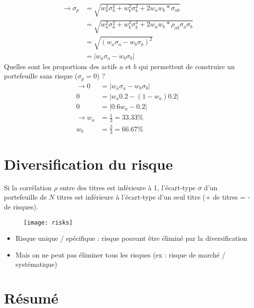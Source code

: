 \begin{enumerate}
\begin{align*}
        \longrightarrow \sigma_p &= \sqrt{w_a^2 \sigma_a^2 + w_b^2 \sigma_b^2 + 2 w_a w_b * \sigma_{ab}} \\
                                 &= \sqrt{w_a^2 \sigma_a^2 + w_b^2 \sigma_b^2 + 2 w_a w_b * \rho_{ab} \sigma_a \sigma_b} \\
                                 &= \sqrt{(w_a \sigma_a - w_b \sigma_b)^2} \\
                                 &= | w_a \sigma_a - w_b \sigma_b |
    \end{align*}
    Quelles sont les proportions des actifs $a$ et $b$ qui permettent de construire un portefeuille sans risque ($\sigma_p = 0$) ?
    \begin{align*}
        \longrightarrow   0 &= | w_a \sigma_a - w_b \sigma_b | \\
                          0 &= | w_a 0.2 - (1-w_a) 0.2 | \\
                          0 &= | 0.6 w_a - 0.2 | \\
        \longrightarrow w_a &= \frac{1}{3} = 33.33\% \\
                        w_b &= \frac{2}{3} = 66.67\%
    \end{align*}
\end{enumerate}

\newpage
\section{Diversification du risque}

Si la corrélation $\rho$ entre des titres est inférieure à 1, l'écart-type $\sigma$ d'un portefeuille de $N$ titres est inférieure à l'écart-type d'un seul titre (+ de titres = - de risques).
\begin{figure}[H]
    \centering
    \texttt{[image: risks]}
\end{figure}
\begin{itemize}
    \item Risque unique / spécifique : risque pouvant être éliminé par la diversification
    \item Mais on ne peut pas éliminer tous les risques (ex : risque de marché / systématique)
\end{itemize}

\section{Résumé}

